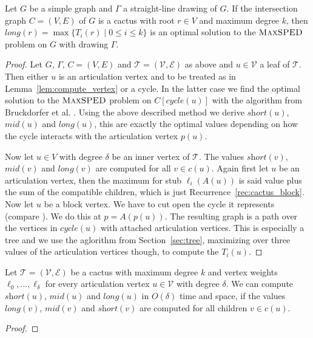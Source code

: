 \documentclass[a4paper,english,numberwithinsect]{eurocg18}
\newcommand{\fabian}[1]{\todo[inline,color=pink!40]{FK: #1}}
\newcommand{\maxsped}{\ensuremath{\textsc{MaxSPED}}\xspace}
\newcommand{\sollong}{\ensuremath{\textit{long}}\xspace}
\newcommand{\solmid}{\ensuremath{\textit{mid}}\xspace}
\newcommand{\solshort}{\ensuremath{\textit{short}}\xspace}
\begin{document}
\begin{lemma}
	\label{lem:cactus_correctness}	
	Let $ G $ be a simple graph and $ \Gamma $ a straight-line drawing of $ G $. If the intersection graph $ C = (V,E) $ of $ G $ is a cactus with root $ r \in V $ and maximum degree $ k $, then $ \sollong(r) = \max \{T_i(r) \mid 0 \leq i \leq k \} $ is an optimal solution to the \maxsped problem on $ G $ with drawing $ \Gamma $.
\end{lemma}
\begin{proof}	
	Let $ G $, $ \Gamma $,  $ C = (V,E) $ and $ \mathcal T = (\mathcal V,\mathcal E) $ as above and $ u \in \mathcal V $ a leaf of $ \mathcal T$. Then either $ u $ is an articulation vertex and to be treated as in Lemma~\ref{lem:compute_vertex} or a cycle. In the latter case we find the optimal solution to the \maxsped problem on $ C[\textit{cycle}(u)] $ with the algorithm from Bruckdorfer et al. \cite{bcgkmn-pped-17}. Using the above described method we derive $ \solshort(u) $, $ \solmid(u) $ and $ \sollong(u) $, this are exactly the optimal values depending on how the cycle interacts with the articulation vertex $ p(u) $.

	Now let $ u \in V $ with degree $ \delta $ be an inner vertex of $ \mathcal T $. The values $ \solshort(v) $, $ \solmid(v) $ and $ \sollong(v) $ are computed for all $ v \in c(u) $. Again first let $ u $ be an articulation vertex, then the maximum for stub $ \ell_i(A(u)) $ is said value plus the sum of the compatible children, which is just Recurrence~\ref{rec:cactus_block}. Now let $ u $ be a block vertex. We have to cut open the cycle it represents (compare \cite{bcgkmn-pped-17}). We do this at $ p = A(p(u)) $. The resulting graph is a path over the vertices in $ \textit{cycle}(u) $ with attached articulation vertices. This is especially a tree and we use the aglorithm from Section~\ref{sec:tree}, maximizing over three values of the articulation vertices though,  to compute the $ T_i(u) $.
\end{proof}

\begin{lemma}
	\label{lem:compute_cactus}
	Let $ \mathcal T = (\mathcal V,\mathcal E) $ be a cactus with maximum degree $ k $ and vertex weights $ \ell_0,\dots,\ell_{\delta} $ for every articulation vertex $ u \in \mathcal V $ with degree $ \delta $. We can compute $ \solshort(u) $, $ \solmid(u) $ and $ \sollong(u) $ in $ O(\delta) $ time and space, if the values $ \sollong(v) $, $ \solmid(v) $ and $ \solshort(v) $ are computed for all children $ v \in c(u) $.
\end{lemma}
\begin{proof}
	\fabian{todo}
\end{proof}
\end{document}
